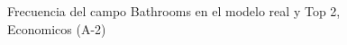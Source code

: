 \begin{figure}[H]
    \centering
    
    \caption{Frecuencia del campo Bathrooms en el modelo real y Top 2, Economicos (A-2)}
    \label{frecuency-Bathrooms-top2}
\end{figure}